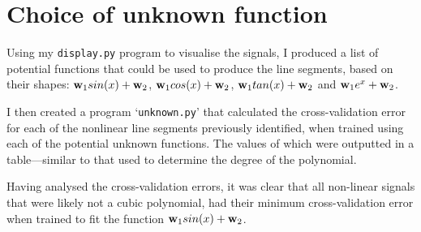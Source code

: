 \documentclass[onecolumn, 12pt, a4paper]{article}
\begin{document}
\section{Choice of unknown function}

Using my \texttt{display.py} program to visualise the
signals, I produced a list of potential functions that could
be used to produce the line segments, based on their shapes:
$\vb{w}_{1}sin(x) + \vb{w}_{2}$,
$\vb{w}_{1}cos(x) + \vb{w}_{2}$,
$\vb{w}_{1}tan(x) + \vb{w}_{2}$ and
$\vb{w}_{1}e^{x} + \vb{w}_{2}$.

I then created a program `\texttt{unknown.py}' that
calculated the cross-validation error for each of the
nonlinear line segments previously identified, when
trained using each of the potential unknown functions.
The values of which were outputted in a table---similar 
to that used to determine the degree of the polynomial.

Having analysed the cross-validation errors, it was clear
that all non-linear signals that were likely not
a cubic polynomial, had their minimum cross-validation
error when trained to fit the function
$\vb{w}_{1}sin(x) + \vb{w}_{2}$.
\end{document}
